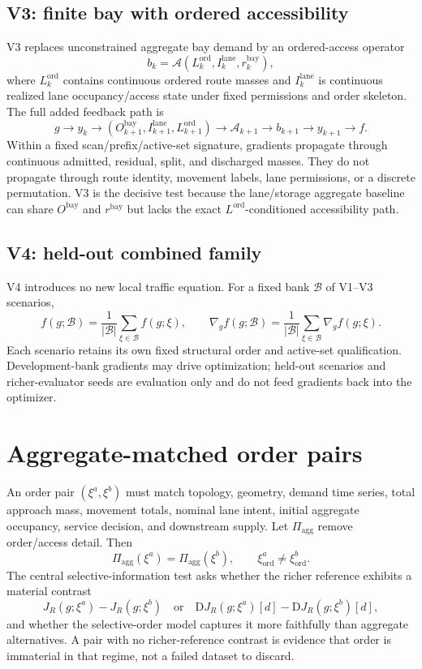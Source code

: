 \documentclass[10pt]{article}
\begin{document}
\subsection*{V3: finite bay with ordered accessibility}
V3 replaces unconstrained aggregate bay demand by an ordered-access operator
\[
  b_k=\mathcal{A}(L_k^{\mathrm{ord}},I_k^{\mathrm{lane}},r_k^{\mathrm{bay}}),
\]
where $L_k^{\mathrm{ord}}$ contains continuous ordered route masses and $I_k^{\mathrm{lane}}$ is continuous realized lane occupancy/access state under fixed permissions and order skeleton. The full added feedback path is
\[
 g\to y_k\to(O_{k+1}^{\mathrm{bay}},I_{k+1}^{\mathrm{lane}},L_{k+1}^{\mathrm{ord}})
 \to \mathcal{A}_{k+1}\to b_{k+1}\to y_{k+1}\to f.
\]
Within a fixed scan/prefix/active-set signature, gradients propagate through continuous admitted, residual, split, and discharged masses. They do not propagate through route identity, movement labels, lane permissions, or a discrete permutation. V3 is the decisive test because the lane/storage aggregate baseline can share $O^{\mathrm{bay}}$ and $r^{\mathrm{bay}}$ but lacks the exact $L^{\mathrm{ord}}$-conditioned accessibility path.

\subsection*{V4: held-out combined family}
V4 introduces no new local traffic equation. For a fixed bank $\mathcal{B}$ of V1--V3 scenarios,
\[
  f(g;\mathcal{B})=\frac{1}{|\mathcal{B}|}\sum_{\xi\in\mathcal{B}}f(g;\xi),
  \qquad
  \nabla_g f(g;\mathcal{B})=\frac{1}{|\mathcal{B}|}\sum_{\xi\in\mathcal{B}}\nabla_g f(g;\xi).
\]
Each scenario retains its own fixed structural order and active-set qualification. Development-bank gradients may drive optimization; held-out scenarios and richer-evaluator seeds are evaluation only and do not feed gradients back into the optimizer.

\section{Aggregate-matched order pairs}
An order pair $(\xi^a,\xi^b)$ must match topology, geometry, demand time series, total approach mass, movement totals, nominal lane intent, initial aggregate occupancy, service decision, and downstream supply. Let $\Pi_{\mathrm{agg}}$ remove order/access detail. Then
\[
  \Pi_{\mathrm{agg}}(\xi^a)=\Pi_{\mathrm{agg}}(\xi^b),
  \qquad \xi^a_{\mathrm{ord}}\ne\xi^b_{\mathrm{ord}}.
\]
The central selective-information test asks whether the richer reference exhibits a material contrast
\[
  J_R(g;\xi^a)-J_R(g;\xi^b)
  \quad\text{or}\quad
  \mathrm{D}J_R(g;\xi^a)[d]-\mathrm{D}J_R(g;\xi^b)[d],
\]
and whether the selective-order model captures it more faithfully than aggregate alternatives. A pair with no richer-reference contrast is evidence that order is immaterial in that regime, not a failed dataset to discard.
\end{document}
